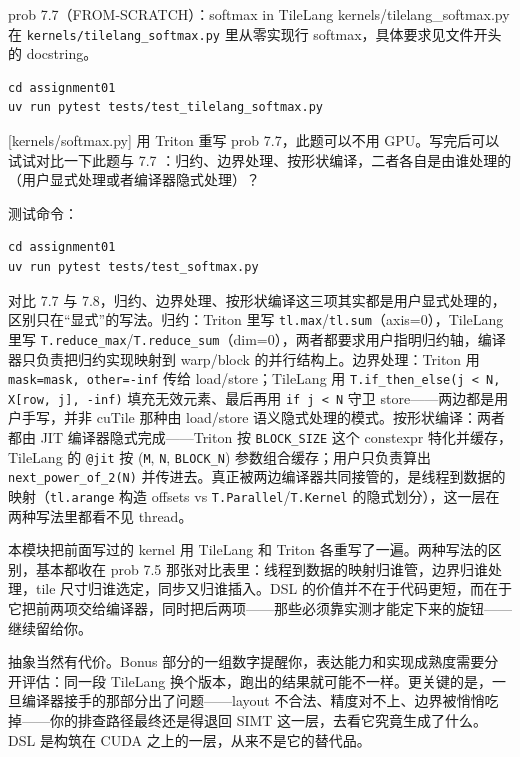 \documentclass[11pt,a4paper,fontset=none]{ctexart}
\begin{document}
\begin{capstone}{prob 7.7（FROM-SCRATCH）：softmax in TileLang \hfill {\footnotesize\ttfamily kernels/tilelang\_softmax.py}}
  在 \texttt{kernels/tilelang\_softmax.py} 里从零实现行 softmax，具体要求见文件开头的 docstring。
\end{capstone}

\begin{lstlisting}
cd assignment01
uv run pytest tests/test_tilelang_softmax.py
\end{lstlisting}

[kernels/softmax.py]
用 Triton 重写 prob 7.7，此题可以不用 GPU。写完后可以试试对比一下此题与 7.7 ：归约、边界处理、按形状编译，二者各自是由谁处理的（用户显式处理或者编译器隐式处理）？

测试命令：

\begin{lstlisting}
cd assignment01
uv run pytest tests/test_softmax.py
\end{lstlisting}

对比 7.7 与 7.8，归约、边界处理、按形状编译这三项其实都是用户显式处理的，区别只在“显式”的写法。归约：Triton 里写 \texttt{tl.max}/\texttt{tl.sum}（axis=0），TileLang 里写 \texttt{T.reduce\_max}/\texttt{T.reduce\_sum}（dim=0），两者都要求用户指明归约轴，编译器只负责把归约实现映射到 warp/block 的并行结构上。边界处理：Triton 用 \texttt{mask=mask, other=-inf} 传给 load/store；TileLang 用 \texttt{T.if\_then\_else(j < N, X[row, j], -inf)} 填充无效元素、最后再用 \texttt{if j < N} 守卫 store——两边都是用户手写，并非 cuTile 那种由 load/store 语义隐式处理的模式。按形状编译：两者都由 JIT 编译器隐式完成——Triton 按 \texttt{BLOCK\_SIZE} 这个 constexpr 特化并缓存，TileLang 的 \texttt{@jit} 按 (\texttt{M}, \texttt{N}, \texttt{BLOCK\_N}) 参数组合缓存；用户只负责算出 \texttt{next\_power\_of\_2(N)} 并传进去。真正被两边编译器共同接管的，是线程到数据的映射（\texttt{tl.arange} 构造 offsets vs \texttt{T.Parallel}/\texttt{T.Kernel} 的隐式划分），这一层在两种写法里都看不见 thread。

\begin{lookback}
  本模块把前面写过的 kernel 用 TileLang 和 Triton 各重写了一遍。两种写法的区别，基本都收在 prob 7.5 那张对比表里：线程到数据的映射归谁管，边界归谁处理，tile 尺寸归谁选定，同步又归谁插入。DSL 的价值并不在于代码更短，而在于它把前两项交给编译器，同时把后两项——那些必须靠实测才能定下来的旋钮——继续留给你。

  抽象当然有代价。Bonus 部分的一组数字提醒你，表达能力和实现成熟度需要分开评估：同一段 TileLang 换个版本，跑出的结果就可能不一样。更关键的是，一旦编译器接手的那部分出了问题——layout 不合法、精度对不上、边界被悄悄吃掉——你的排查路径最终还是得退回 SIMT 这一层，去看它究竟生成了什么。DSL 是构筑在 CUDA 之上的一层，从来不是它的替代品。
\end{lookback}
\end{document}
